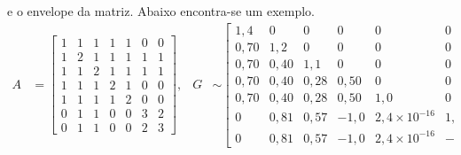\documentclass[]{beamer}
\begin{document}
\begin{frame}[t,fragile]
\begin{columns}[t]
\begin{column}{0.4\textwidth}
      e o envelope da matriz. Abaixo encontra-se um exemplo.
  \begin{align*}
      A &= \begin{bmatrix}
          1 & 1 & 1 & 1 & 1 & 0 & 0 \\
          1 & 2 & 1 & 1 & 1 & 1 & 1 \\
          1 & 1 & 2 & 1 & 1 & 1 & 1 \\
          1 & 1 & 1 & 2 & 1 & 0 & 0 \\
          1 & 1 & 1 & 1 & 2 & 0 & 0 \\
          0 & 1 & 1 & 0 & 0 & 3 & 2 \\
          0 & 1 & 1 & 0 & 0 & 2 & 3
      \end{bmatrix}, &
      G &\sim \begin{bmatrix}
          1,4 & 0   & 0   &  0    & 0                   &  0                   &  0   \\
          0,70& 1,2 & 0   &  0    & 0                   &  0                   &  0   \\
          0,70& 0,40& 1,1 &  0    & 0                   &  0                   &  0   \\
          0,70& 0,40& 0,28&  0,50 & 0                   &  0                   &  0   \\
          0,70& 0,40& 0,28&  0,50 & 1,0                 &  0                   &  0   \\
          0   & 0,81& 0,57& -1,0  & 2,4 \times 10^{-16} &  1,0                 &  0   \\
          0   & 0,81& 0,57& -1,0  & 2,4 \times 10^{-16} & -1,7 \times 10^{-15} &  1,0
      \end{bmatrix}.
  \end{align*}


\end{column}
\end{columns}
\end{frame}
\end{document}
